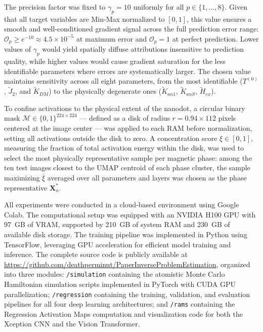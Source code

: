 \documentclass[final,5p,times,twocolumn]{elsarticle}
\begin{document}
The precision factor was fixed to 
$\gamma_p = 10$ uniformly for all 
$p \in \{1,\dots,8\}$. Given that all target 
variables are Min-Max normalized to $[0,1]$, 
this value ensures a smooth and well-conditioned 
gradient signal across the full prediction error 
range: $\mathcal{O}_p \geq e^{-10} \approx 
4.5\times10^{-5}$ at maximum error and 
$\mathcal{O}_p = 1$ at perfect prediction. 
Lower values of $\gamma_p$ would yield spatially 
diffuse attributions insensitive to prediction 
quality, while higher values would cause gradient 
saturation for the less identifiable parameters 
where errors are systematically larger. The 
chosen value maintains sensitivity across all 
eight parameters, from the most identifiable 
($T^{(0)}$, $\tilde{J}_2$, and $\tilde{K}_{DM}$) 
to the physically degenerate ones 
($\tilde{K}_{an1}$, $\tilde{K}_{anS}$, 
$\tilde{H}_{ex}$).

To confine activations to the physical extent 
of the nanodot, a circular binary mask 
$\mathcal{M}\in\{0,1\}^{224\times224}$ --- 
defined as a disk of radius $r = 0.94\times112$ 
pixels centered at the image center --- was 
applied to each RAM before normalization, 
setting all activations outside the disk to 
zero. A concentration score $\xi\in[0,1]$, 
measuring the fraction of total activation 
energy within the disk, was used to select 
the most physically representative sample per 
magnetic phase: among the ten test images 
closest to the UMAP centroid of each phase 
cluster, the sample maximizing $\bar{\xi}$ 
averaged over all parameters and layers was 
chosen as the phase representative 
$\mathbf{X}_n^*$.

All experiments were conducted in a cloud-based 
environment using Google Colab. The computational 
setup was equipped with an NVIDIA H100 GPU with 
97~GB of VRAM, supported by 210~GB of system RAM 
and 230~GB of available disk storage. The training 
pipeline was implemented in Python using TensorFlow, 
leveraging GPU acceleration for efficient model 
training and inference. The complete source code 
is publicly available at 
\url{https://github.com/deathperminut/PaperInverseProblemEstimation}, 
organized into three modules: 
\texttt{/simulation} containing the atomistic 
Monte Carlo Hamiltonian simulation scripts 
implemented in PyTorch with CUDA GPU 
parallelization; \texttt{/regression} containing 
the training, validation, and evaluation pipelines 
for all four deep learning architectures; and 
\texttt{/rams} containing the Regression Activation 
Maps computation and visualization code for both 
the Xception CNN and the Vision Transformer.
\end{document}
